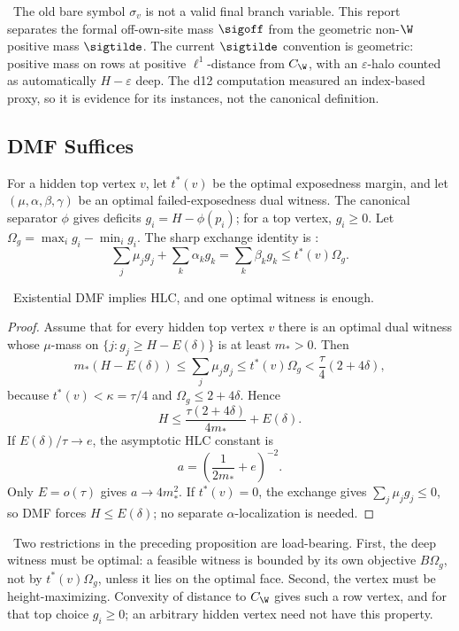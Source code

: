 \begin{downgradedstatement}
\downgradedbadge\  The old bare symbol \(\sigma_v\) is not a valid final
branch variable.  This report separates the formal off-own-site mass
\(\sigoff\) from the geometric non-\(\W\) positive mass \(\sigtilde\).
The current \(\sigtilde\) convention is geometric: positive mass on rows at
positive \(\ell^1\)-distance from \(C_{\W}\), with an \(\varepsilon\)-halo
counted as automatically \(H-\varepsilon\) deep.  The d12 computation measured
an index-based proxy, so it is evidence for its instances, not the canonical
definition.
\end{downgradedstatement}

\subsection{DMF Suffices}
For a hidden top vertex \(v\), let \(t^*(v)\) be the optimal exposedness
margin, and let \((\mu,\alpha,\beta,\gamma)\) be an optimal failed-exposedness
dual witness.  The canonical separator \(\phi\) gives deficits
\(g_i=H-\phi(p_i)\); for a top vertex, \(g_i\geq0\).  Let
\(\Omega_g=\max_i g_i-\min_i g_i\).  The sharp exchange identity is
\provedbadge:
\[
\sum_j\mu_jg_j+\sum_k\alpha_kg_k
  =\sum_k\beta_kg_k
  \leq t^*(v)\Omega_g .
\]

\begin{proposition}
\modauditbadge\  Existential DMF implies HLC, and one optimal witness is
enough.
\end{proposition}
\begin{proof}
Assume that for every hidden top vertex \(v\) there is an optimal dual witness
whose \(\mu\)-mass on \(\{j:g_j\geq H-E(\delta)\}\) is at least \(m_*>0\).
Then
\[
m_*(H-E(\delta))\leq\sum_j\mu_jg_j
  \leq t^*(v)\Omega_g
  < \frac{\tau}{4}(2+4\delta),
\]
because \(t^*(v)<\kappa=\tau/4\) and \(\Omega_g\leq2+4\delta\).  Hence
\[
H\leq \frac{\tau(2+4\delta)}{4m_*}+E(\delta).
\]
If \(E(\delta)/\tau\to e\), the asymptotic HLC constant is
\[
a=\left(\frac{1}{2m_*}+e\right)^{-2}.
\]
Only \(E=o(\tau)\) gives \(a\to4m_*^2\).  If \(t^*(v)=0\), the exchange gives
\(\sum_j\mu_jg_j\leq0\), so DMF forces \(H\leq E(\delta)\); no separate
\(\alpha\)-localization is needed.
\end{proof}

\begin{warning}
\modauditbadge\  Two restrictions in the preceding proposition are
load-bearing.  First, the deep witness must be optimal: a feasible witness is
bounded by its own objective \(B\Omega_g\), not by \(t^*(v)\Omega_g\), unless
it lies on the optimal face.  Second, the vertex must be height-maximizing.
Convexity of distance to \(C_{\W}\) gives such a row vertex, and for that top
choice \(g_i\geq0\); an arbitrary hidden vertex need not have this property.
\end{warning}

